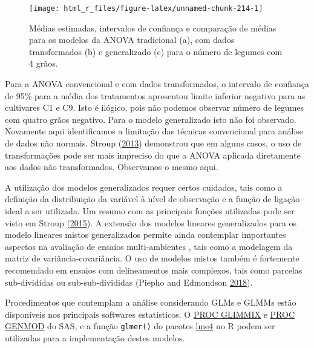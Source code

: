 \documentclass[
]{book}
\numberwithin{equation}{section}
\newcommand{\indt}[1]{\index{#1|ST}}
\begin{document}
\begin{figure}

{\centering \texttt{[image: html\_r\_files/figure-latex/unnamed-chunk-214-1]} 

}

\caption{Médias estimadas, intervalos de confiança e comparação de médias para os modelos da ANOVA tradicional (a), com dados transformados (b) e generalizado (c) para o número de legumes com 4 grãos.}\label{fig:unnamed-chunk-214}
\end{figure}

Para a ANOVA convencional e com dados transformados, o intervalo de confiança de 95\% para a média dos tratamentos apresentou limite inferior negativo para as cultivares C1 e C9. Isto é ilógico, pois não podemos observar número de legumes com quatro grãos negativo. Para o modelo generalizado isto não foi observado. Novamente aqui identificamos a limitação das técnicas convencional para análise de dados não normais. Stroup (\protect\hyperlink{ref-Stroup2013}{2013}) demonstrou que em alguns casos, o uso de transformações pode ser mais impreciso do que a ANOVA aplicada diretamente aos dados não transformados. Observamos o mesmo aqui.

A utilização dos modelos generalizados requer certos cuidados, tais como a definição da distribuição da variável à nível de observação e a função de ligação ideal a ser utilizada. Um resumo com as principais funções utilizadas pode ser visto em Stroup (\protect\hyperlink{ref-Stroup2015}{2015}). A extensão dos modelos lineares generalizados para os modelo lineares mistos generalizados permite ainda contemplar importantes aspectos na avaliação de ensaios multi-ambientes \indt{EMA}, tais como a modelagem da matriz de variância-covariância. O uso de modelos mistos também é fortemente recomendado em ensaios com delineamentos mais complexos, tais como parcelas sub-divididas ou sub-sub-divididas (Piepho and Edmondson \protect\hyperlink{ref-Piepho2018}{2018}).

Procedimentos que contemplam a análise considerando GLMs\indt{GLMs} e GLMMs\indt{GLMMs} estão disponíveis nos principais softwares estatísticos. O \href{https://support.sas.com/documentation/cdl/en/statug/63033/HTML/default/viewer.htm\#statug_glimmix_a0000001394.htm}{PROC GLIMMIX} e \href{https://support.sas.com/documentation/cdl/en/statug/63033/HTML/default/viewer.htm\#statug_genmod_sect001.htm}{PROC GENMOD} do SAS, e a função \texttt{glmer()} do pacotes \href{https://cran.r-project.org/web/packages/lme4/index.html}{lme4} no R podem ser utilizadas para a implementação destes modelos.
\end{document}
